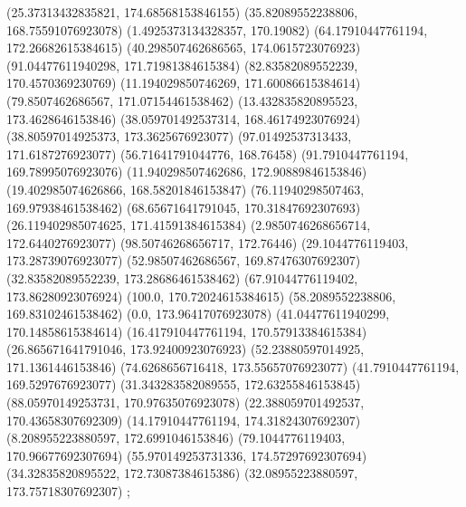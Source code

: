 {{{		(25.37313432835821, 174.68568153846155)
		(35.82089552238806, 168.75591076923078)
		(1.4925373134328357, 170.19082)
		(64.17910447761194, 172.26682615384615)
		(40.298507462686565, 174.0615723076923)
		(91.04477611940298, 171.71981384615384)
		(82.83582089552239, 170.4570369230769)
		(11.194029850746269, 171.60086615384614)
		(79.8507462686567, 171.07154461538462)
		(13.432835820895523, 173.4628646153846)
		(38.059701492537314, 168.46174923076924)
		(38.80597014925373, 173.3625676923077)
		(97.01492537313433, 171.6187276923077)
		(56.71641791044776, 168.76458)
		(91.7910447761194, 169.78995076923076)
		(11.940298507462686, 172.90889846153846)
		(19.402985074626866, 168.58201846153847)
		(76.11940298507463, 169.97938461538462)
		(68.65671641791045, 170.31847692307693)
		(26.119402985074625, 171.41591384615384)
		(2.9850746268656714, 172.6440276923077)
		(98.50746268656717, 172.76446)
		(29.1044776119403, 173.28739076923077)
		(52.98507462686567, 169.87476307692307)
		(32.83582089552239, 173.28686461538462)
		(67.91044776119402, 173.86280923076924)
		(100.0, 170.72024615384615)
		(58.2089552238806, 169.83102461538462)
		(0.0, 173.96417076923078)
		(41.04477611940299, 170.14858615384614)
		(16.417910447761194, 170.57913384615384)
		(26.865671641791046, 173.92400923076923)
		(52.23880597014925, 171.1361446153846)
		(74.6268656716418, 173.55657076923077)
		(41.7910447761194, 169.5297676923077)
		(31.343283582089555, 172.63255846153845)
		(88.05970149253731, 170.97635076923078)
		(22.388059701492537, 170.43658307692309)
		(14.17910447761194, 174.31824307692307)
		(8.208955223880597, 172.6991046153846)
		(79.1044776119403, 170.96677692307694)
		(55.970149253731336, 174.57297692307694)
		(34.32835820895522, 172.73087384615386)
		(32.08955223880597, 173.75718307692307)
	};

}}
